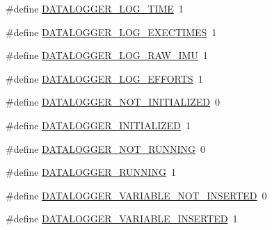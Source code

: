 \begin{DoxyCompactItemize}
\item 
\#define \hyperlink{datalogger_01_07C_xC3_xB3pia_01em_01conflito_01de_01Andr_xC3_xA9_01Carvalho_012013-04-26_08_8h_a9796dd7063d48a850456a4542c5a5fb5}{D\-A\-T\-A\-L\-O\-G\-G\-E\-R\-\_\-\-L\-O\-G\-\_\-\-T\-I\-M\-E}~1
\item 
\#define \hyperlink{datalogger_01_07C_xC3_xB3pia_01em_01conflito_01de_01Andr_xC3_xA9_01Carvalho_012013-04-26_08_8h_ade62d89afc68e01d78fa75ae491a9980}{D\-A\-T\-A\-L\-O\-G\-G\-E\-R\-\_\-\-L\-O\-G\-\_\-\-E\-X\-E\-C\-T\-I\-M\-E\-S}~1
\item 
\#define \hyperlink{datalogger_01_07C_xC3_xB3pia_01em_01conflito_01de_01Andr_xC3_xA9_01Carvalho_012013-04-26_08_8h_a1c623aa143d8b2e0d507e23425a02275}{D\-A\-T\-A\-L\-O\-G\-G\-E\-R\-\_\-\-L\-O\-G\-\_\-\-R\-A\-W\-\_\-\-I\-M\-U}~1
\item 
\#define \hyperlink{datalogger_01_07C_xC3_xB3pia_01em_01conflito_01de_01Andr_xC3_xA9_01Carvalho_012013-04-26_08_8h_a210c5f76b25cb165226a337189a9715f}{D\-A\-T\-A\-L\-O\-G\-G\-E\-R\-\_\-\-L\-O\-G\-\_\-\-E\-F\-F\-O\-R\-T\-S}~1
\item 
\#define \hyperlink{datalogger_01_07C_xC3_xB3pia_01em_01conflito_01de_01Andr_xC3_xA9_01Carvalho_012013-04-26_08_8h_a4602a65fdfa920dfe832cfa50b7ee4c8}{D\-A\-T\-A\-L\-O\-G\-G\-E\-R\-\_\-\-N\-O\-T\-\_\-\-I\-N\-I\-T\-I\-A\-L\-I\-Z\-E\-D}~0
\item 
\#define \hyperlink{datalogger_01_07C_xC3_xB3pia_01em_01conflito_01de_01Andr_xC3_xA9_01Carvalho_012013-04-26_08_8h_a684c343d340004b77ca2b782934c96ca}{D\-A\-T\-A\-L\-O\-G\-G\-E\-R\-\_\-\-I\-N\-I\-T\-I\-A\-L\-I\-Z\-E\-D}~1
\item 
\#define \hyperlink{datalogger_01_07C_xC3_xB3pia_01em_01conflito_01de_01Andr_xC3_xA9_01Carvalho_012013-04-26_08_8h_a1a224da36800f52f56f30619849f7f5d}{D\-A\-T\-A\-L\-O\-G\-G\-E\-R\-\_\-\-N\-O\-T\-\_\-\-R\-U\-N\-N\-I\-N\-G}~0
\item 
\#define \hyperlink{datalogger_01_07C_xC3_xB3pia_01em_01conflito_01de_01Andr_xC3_xA9_01Carvalho_012013-04-26_08_8h_a2cf92051a019c8ec1b5c4f5380758f62}{D\-A\-T\-A\-L\-O\-G\-G\-E\-R\-\_\-\-R\-U\-N\-N\-I\-N\-G}~1
\item 
\#define \hyperlink{datalogger_01_07C_xC3_xB3pia_01em_01conflito_01de_01Andr_xC3_xA9_01Carvalho_012013-04-26_08_8h_a1f4fd2dbd981cf35467ab688c9157a74}{D\-A\-T\-A\-L\-O\-G\-G\-E\-R\-\_\-\-V\-A\-R\-I\-A\-B\-L\-E\-\_\-\-N\-O\-T\-\_\-\-I\-N\-S\-E\-R\-T\-E\-D}~0
\item 
\#define \hyperlink{datalogger_01_07C_xC3_xB3pia_01em_01conflito_01de_01Andr_xC3_xA9_01Carvalho_012013-04-26_08_8h_a181f9a0649abd26c74ed1a8a1710e25f}{D\-A\-T\-A\-L\-O\-G\-G\-E\-R\-\_\-\-V\-A\-R\-I\-A\-B\-L\-E\-\_\-\-I\-N\-S\-E\-R\-T\-E\-D}~1

\end{DoxyCompactItemize}

